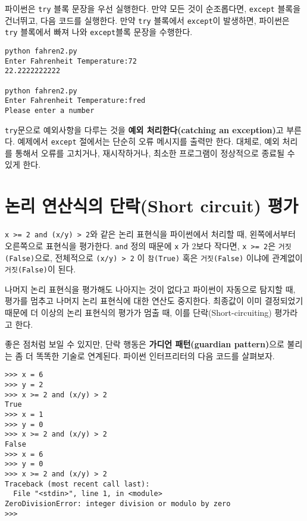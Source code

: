 파이썬은 {\tt try} 블록 문장을 우선 실행한다. 
만약 모든 것이 순조롭다면, {\tt except} 블록을 건너뛰고, 다음 코드를 실행한다.
만약 {\tt try} 블록에서 {\tt except}이 발생하면, 
파이썬은 {\tt try} 블록에서 빠져 나와 {\tt except}블록 문장을 수행한다.

\beforeverb
\begin{verbatim}
python fahren2.py 
Enter Fahrenheit Temperature:72
22.2222222222

python fahren2.py 
Enter Fahrenheit Temperature:fred
Please enter a number
\end{verbatim}
\afterverb
%

{\tt try}문으로 예외사항을 다루는 것을 {\bf 예외 처리한다(catching an exception)}고 부른다.
예제에서 {\tt except} 절에서는 단순히 오류 메시지를 출력만 한다. 
대체로, 예외 처리를 통해서 오류를 고치거나, 재시작하거나, 최소한 프로그램이 정상적으로 종료될 수 있게 한다.

\section{논리 연산식의 단락(Short circuit) 평가}

{\tt x >= 2 and (x/y) > 2}와 같은 논리 표현식을 파이썬에서 처리할 때, 왼쪽에서부터 오른쪽으로 표현식을 평가한다.
{\tt and} 정의 때문에 {\tt x} 가 2보다 작다면, {\tt x >= 2}은 {\tt 거짓(False)}으로, 
전체적으로 {\tt (x/y) > 2} 이 {\tt 참(True)} 혹은 {\tt 거짓(False)} 이냐에 관계없이 {\tt 거짓(False)}이 된다. 

나머지 논리 표현식을 평가해도 나아지는 것이 없다고 파이썬이 자동으로 탐지할 때,
평가를 멈추고 나머지 논리 표현식에 대한 연산도 중지한다. 
최종값이 이미 결정되었기 때문에 더 이상의 논리 표현식의 평가가 멈출 때, 이를 단락(Short-circuiting) 평가라고 한다.


좋은 점처럼 보일 수 있지만, 단락 행동은 {\bf 가디언 패턴(guardian pattern)}으로 불리는 좀 더 똑똑한 기술로 연계된다.
파이썬 인터프리터의 다음 코드를 살펴보자.

\beforeverb
\begin{verbatim}
>>> x = 6 
>>> y = 2
>>> x >= 2 and (x/y) > 2
True
>>> x = 1 
>>> y = 0
>>> x >= 2 and (x/y) > 2
False
>>> x = 6
>>> y = 0
>>> x >= 2 and (x/y) > 2
Traceback (most recent call last):
  File "<stdin>", line 1, in <module>
ZeroDivisionError: integer division or modulo by zero
>>> 
\end{verbatim}
\afterverb
%

